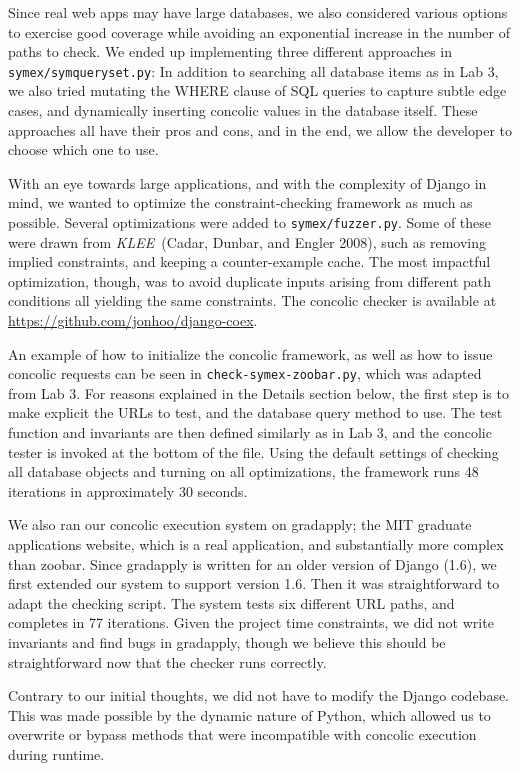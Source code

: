 \documentclass{article}
\begin{document}
Since real web apps may have large databases, we also considered various
options to exercise good coverage while avoiding an exponential increase in the
number of paths to check. We ended up implementing three different approaches
in \texttt{symex/symqueryset.py}: In addition to searching all database items as
in Lab 3, we also tried mutating the WHERE clause of SQL queries to
capture subtle edge cases, and dynamically inserting concolic values
in the database itself. These approaches all have their pros and cons,
and in the end, we allow the developer to choose which one to use.

With an eye towards large applications, and with the complexity of Django in mind,
we wanted to optimize the constraint-checking framework as much
as possible. Several optimizations were added to \texttt{symex/fuzzer.py}. Some
of these were drawn from \textit{KLEE}~(Cadar, Dunbar, and Engler 2008), such
as removing implied constraints, and keeping a counter-example cache.
The most impactful optimization, though, was to avoid duplicate inputs
arising from different path conditions all yielding the same constraints.
The concolic checker is available at \url{https://github.com/jonhoo/django-coex}.

An example of how to initialize the concolic framework, as well as how to issue
concolic requests can be seen in \texttt{check-symex-zoobar.py}, which was
adapted from Lab 3. For reasons explained in the Details section below, the
first step is to make explicit the URLs to test, and the database query method
to use. The test function and invariants are then defined similarly as in Lab
3, and the concolic tester is invoked at the bottom of the file. Using the
default settings of checking all database objects and turning on all
optimizations, the framework runs 48 iterations in approximately 30 seconds.

We also ran our concolic execution system on gradapply; the MIT graduate
applications website, which is a real application, and substantially more
complex than zoobar. Since gradapply is
written for an older version of Django (1.6), we first extended our
system to support version 1.6. Then it was straightforward to adapt
the checking script. The system tests six different URL paths, and
completes in 77 iterations. Given the project time constraints, we did not
write invariants and find bugs in gradapply, though we believe this should be
straightforward now that the checker runs correctly.

Contrary to our initial thoughts, we did not have to modify the
Django codebase. This was made possible by the dynamic nature of
Python, which allowed us to overwrite or bypass methods that were
incompatible with concolic execution during runtime.
\end{document}
